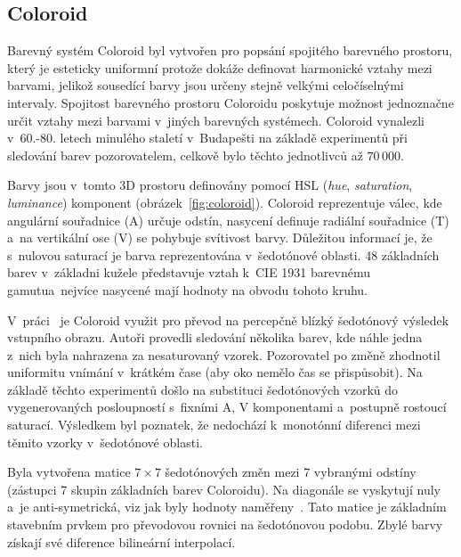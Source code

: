 \documentclass[11pt,a4paper,oneside]{article}
\begin{document}
	\subsection{Coloroid}
	Barevný systém Coloroid byl vytvořen pro popsání spojitého barevného prostoru,
	který je esteticky uniformní protože dokáže definovat harmonické vztahy mezi barvami,
	jelikož sousedící barvy jsou určeny stejně velkými celočíselnými intervaly.
	Spojitost barevného prostoru Coloroidu poskytuje možnost jednoznačne určit
	vztahy mezi barvami v~jiných barevných systémech. Coloroid vynalezli v~60.-80. letech
	minulého staletí v~Budapešti na základě experimentů při sledování barev pozorovatelem,
	celkově bylo těchto jednotlivců až $70\,000$.

	Barvy jsou v~tomto 3D prostoru definovány pomocí HSL (\emph{hue}, \emph{saturation},
	\emph{luminance}) komponent (obrázek~\ref{fig:coloroid}).
	Coloroid reprezentuje válec, kde angulární souřadnice
	(A) určuje odstín, nasycení definuje radiální souřadnice (T) a~na vertikální ose (V)
	se pohybuje svítivost barvy. Důležitou informací je, že s~nulovou saturací je barva
	reprezentována v~šedotónové oblasti. 48 základních barev  v~základni kužele
	představuje vztah k~CIE 1931 barevnému gamutua~nejvíce nasycené mají hodnoty na obvodu tohoto kruhu.

	V~práci~\cite{cadik07color_to_gray} je Coloroid využit pro převod na percepčně blízký šedotónový výsledek
	vstupního obrazu. Autoři provedli sledování několika barev, kde náhle jedna z~nich byla
	nahrazena za nesaturovaný vzorek. Pozorovatel po změně zhodnotil uniformitu vnímání v~krátkém
	čase (aby oko nemělo čas se přispůsobit). Na základě těchto experimentů došlo na
	substituci šedotónových vzorků do vygenerovaných posloupností s~fixními A, V komponentami
	a~postupně rostoucí saturací. Výsledkem byl poznatek, že nedochází k~monotónní diferenci mezi
	těmito vzorky v~šedotónové oblasti.

	Byla vytvořena matice $7 \times 7$ šedotónových změn mezi 7 vybranými odstíny (zástupci 7 skupin
	základních barev Coloroidu). Na diagonále se vyskytují nuly a~je anti-symetrická, viz
	jak byly hodnoty naměřeny~\cite{cadik07color_to_gray, cadik08phd}. Tato matice je základním stavebním prvkem pro převodovou
	rovnici na šedotónovou podobu. Zbylé barvy získají své diference bilineární interpolací.
\end{document}

